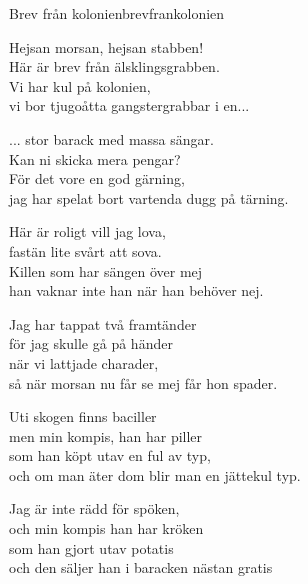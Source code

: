 \newpage

\begin{song}{Brev från kolonien}{brevfrankolonien}
\begin{vers}
Hejsan morsan, hejsan stabben! \\
Här är brev från älsklingsgrabben.\\
Vi har kul på kolonien,\\
vi bor tjugoåtta gangstergrabbar i en...\\
\end{vers}
\begin{vers}
... stor barack med massa sängar. \\
Kan ni skicka mera pengar?\\
För det vore en god gärning,\\
jag har spelat bort vartenda dugg på tärning.\\
\end{vers}
\begin{vers}
Här är roligt vill jag lova, \\
fastän lite svårt att sova.\\
Killen som har sängen över mej\\
han vaknar inte han när han behöver nej.\\
\end{vers}
\begin{vers}
Jag har tappat två framtänder \\
för jag skulle gå på händer\\
när vi lattjade charader,\\
så när morsan nu får se mej får hon spader.\\
\end{vers}
\begin{vers}
Uti skogen finns baciller \\
men min kompis, han har piller\\
som han köpt utav en ful av typ,\\
och om man äter dom blir man en jättekul typ.\\
\end{vers}
\begin{vers}
Jag är inte rädd för spöken, \\
och min kompis han har kröken\\
som han gjort utav potatis\\
och den säljer han i baracken nästan gratis\\
\end{vers}
\begin{vers}

\end{vers}
\end{song}
